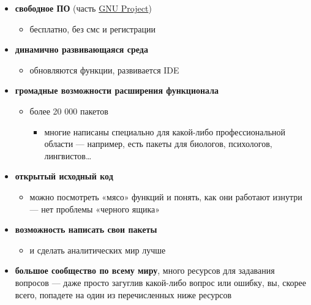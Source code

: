 \documentclass[
  letterpaper,
  DIV=11,
  numbers=noendperiod]{scrreprt}
\providecommand{\tightlist}{%
  \setlength{\itemsep}{0pt}\setlength{\parskip}{0pt}}\usepackage{longtable,booktabs,array}
\theoremstyle{definition}
\theoremstyle{remark}
\begin{document}
\begin{itemize}
\tightlist
\item
  \textbf{свободное ПО} (часть
  \href{https://en.wikipedia.org/wiki/GNU_Project}{GNU Project})

  \begin{itemize}
  \tightlist
  \item
    бесплатно, без смс и регистрации
  \end{itemize}
\item
  \textbf{динамично развивающаяся среда}

  \begin{itemize}
  \tightlist
  \item
    обновляются функции, развивается IDE
  \end{itemize}
\item
  \textbf{громадные возможности расширения функционала}

  \begin{itemize}
  \tightlist
  \item
    более 20 000 пакетов

    \begin{itemize}
    \tightlist
    \item
      многие написаны специально для какой-либо профессиональной области
      --- например, есть пакеты для биологов, психологов,
      лингвистов\ldots{}
    \end{itemize}
  \end{itemize}
\item
  \textbf{открытый исходный код}

  \begin{itemize}
  \tightlist
  \item
    можно посмотреть «мясо» функций и понять, как они работают изнутри
    --- нет проблемы «черного ящика»
  \end{itemize}
\item
  \textbf{возможность написать свои пакеты}

  \begin{itemize}
  \tightlist
  \item
    и сделать аналитических мир лучше
  \end{itemize}
\item
  \textbf{большое сообщество по всему миру}, много ресурсов для
  задавания вопросов --- даже просто загуглив какой-либо вопрос или
  ошибку, вы, скорее всего, попадете на один из перечисленных ниже
  ресурсов


\end{itemize}
\end{document}
